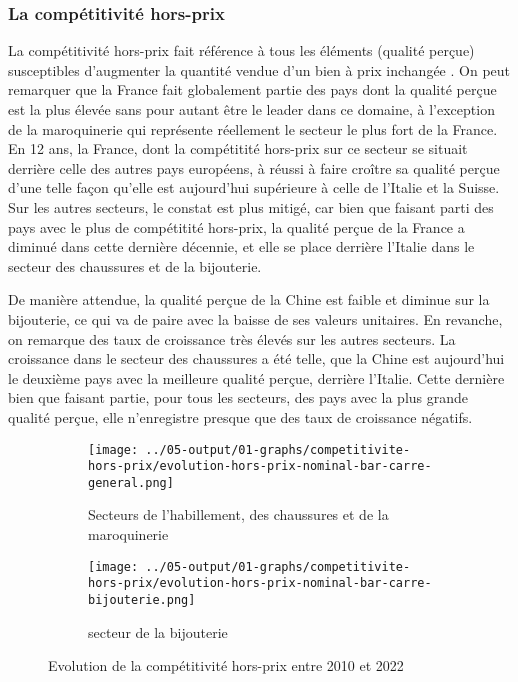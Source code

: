 \documentclass[french,10pt,a4paper]{article}
\begin{document}
\subsubsection{La compétitivité hors-prix}
La compétitivité hors-prix fait référence à tous les éléments (qualité perçue) susceptibles d'augmenter la quantité vendue d'un bien à prix inchangée \citep{Khandelwal2013}. On peut remarquer que la France fait globalement partie des pays dont la qualité perçue est la plus élevée sans pour autant être le leader dans ce domaine, à l'exception de la maroquinerie qui représente réellement le secteur le plus fort de la France. En 12 ans, la France, dont la compétitité hors-prix sur ce secteur se situait derrière celle des autres pays européens, à réussi à faire croître sa qualité perçue d'une telle façon qu'elle est aujourd'hui supérieure à celle de l'Italie et la Suisse. Sur les autres secteurs, le constat est plus mitigé, car bien que faisant parti des pays avec le plus de compétitité hors-prix, la qualité perçue de la France a diminué dans cette dernière décennie, et elle se place derrière l'Italie dans le secteur des chaussures et de la bijouterie.

De manière attendue, la qualité perçue de la Chine est faible et diminue sur la bijouterie, ce qui va de paire avec la baisse de ses valeurs unitaires. En revanche, on remarque des taux de croissance très élevés sur les autres secteurs. La croissance dans le secteur des chaussures a été telle, que la Chine est aujourd'hui le deuxième pays avec la meilleure qualité perçue, derrière l'Italie. Cette dernière bien que faisant partie, pour tous les secteurs, des pays avec la plus grande qualité perçue, elle n'enregistre presque que des taux de croissance négatifs. 


\begin{figure}[!h]
  \centering
  \begin{subfigure}{\textwidth}
    \centering    \texttt{[image: ../05-output/01-graphs/competitivite-hors-prix/evolution-hors-prix-nominal-bar-carre-general.png]}
    \caption{Secteurs de l'habillement, des chaussures et de la maroquinerie}
    \label{fig:evolution-hors-prix-nominal-bar-carre-general}
  \end{subfigure}
  \vspace{0.5cm}
  \begin{subfigure}{\textwidth}
    \centering \texttt{[image: ../05-output/01-graphs/competitivite-hors-prix/evolution-hors-prix-nominal-bar-carre-bijouterie.png]}
 \caption{secteur de la bijouterie}
 \label{fig:evolution-hors-prix-nominal-bar-carre-bijouterie.png}
  \end{subfigure}
  \caption{Evolution de la compétitivité hors-prix entre 2010 et 2022}
  \label{fig:hors-prix}
\end{figure}




\newpage


\end{document}
